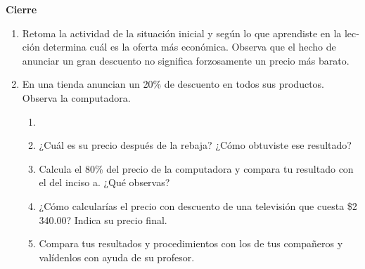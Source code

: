 \documentclass[11pt]{book}
\begin{document}
\begin{boxK}
  \begin{center}\textbf{Cierre}\end{center}

  \begin{enumerate}
    \item Retoma la actividad de la situación inicial y según lo que aprendiste en la lec-
          ción determina cuál es la oferta más económica. Observa que el hecho de
          anunciar un gran descuento no significa forzosamente un precio más barato.
    \item En una tienda anuncian un 20\% de descuento en todos sus productos. Observa
          la computadora.
          \begin{enumerate}
            \item \item ¿Cuál es su precio después de la rebaja? ¿Cómo obtuviste ese resultado?
            \item Calcula el 80\% del precio de la computadora y compara tu resultado con el del inciso a. ¿Qué observas?
            \item ¿Cómo calcularías el precio con descuento de una televisión que cuesta \$2 340.00? Indica su precio final.
            \item Compara tus resultados y procedimientos con los de tus compañeros y valídenlos con ayuda de su profesor.
          \end{enumerate}
  \end{enumerate}
\end{boxK}
\newpage
\end{document}

